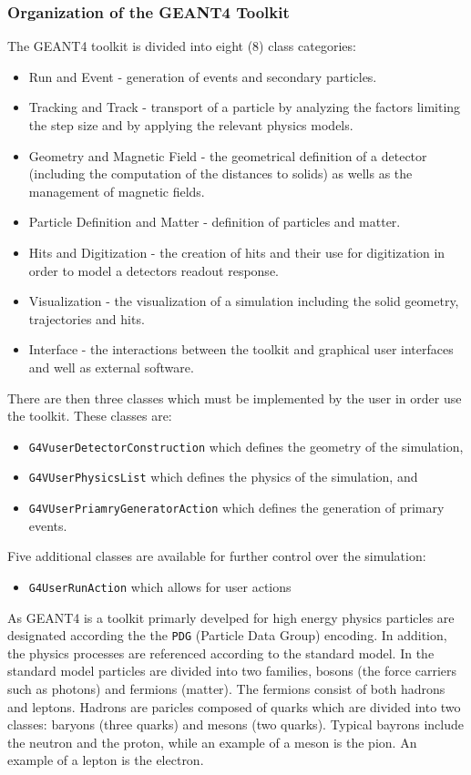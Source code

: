 \subsubsection{Organization of the GEANT4 Toolkit}
The GEANT4 toolkit is divided into eight (8) class categories:
\begin{itemize}
    \item Run and Event - generation of events and secondary particles.
    \item Tracking and Track - transport of a particle by analyzing the factors limiting the step size and by applying the relevant physics models.
    \item Geometry and Magnetic Field - the geometrical definition of a detector (including the computation of the distances to solids) as wells as the management of magnetic fields.
    \item Particle Definition and Matter - definition of particles and matter.
    \item Hits and Digitization - the creation of hits and their use for digitization in order to model a detectors readout response.
    \item Visualization - the visualization of a simulation including the solid geometry, trajectories and hits.
    \item Interface - the interactions between the toolkit and graphical user interfaces and well as external software.
\end{itemize}

There are then three classes which must be implemented by the user in order use the toolkit. These classes are:
\begin{itemize}
    \item \verb+G4VuserDetectorConstruction+ which defines the geometry of the simulation,
    \item \verb+G4VUserPhysicsList+ which defines the physics of the simulation, and
    \item \verb+G4VUserPriamryGeneratorAction+ which defines the generation of primary events.
\end{itemize}
Five additional classes are available for further control over the simulation:
\begin{itemize}
    \item \verb+G4UserRunAction+ which allows for user actions
\end{itemize}

As GEANT4 is a toolkit primarly develped for high energy physics particles are designated according the the \verb+PDG+ (Particle Data Group) encoding.
In addition, the physics processes are referenced according to the standard model.
In the standard model particles are divided into two families, bosons (the force carriers such as photons) and fermions (matter).
The fermions consist of both hadrons and leptons.
Hadrons are paricles composed of quarks which are divided into two classes: baryons (three quarks) and mesons (two quarks).
Typical bayrons include the neutron and the proton, while an example of a meson is the pion.
An example of a lepton is the electron.
